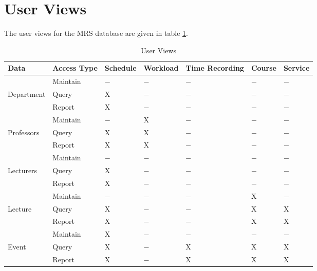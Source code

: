 \clearpage

\section{User Views}
The user views for the MRS database are given in table \ref{tab:userviews}.

\begin{table}[h]
	\centering
	\begin{tabularx}{\textwidth}{XXXXXXX}
		Data & Access Type & Schedule & Workload & Time Recording & Course & Service \\
		\toprule
				& Maintain	& $-$ 	& $-$	& $-$	& $-$ 	& $-$	\\
		Department	& Query		& X 	& $-$	& $-$	& $-$ 	& $-$	\\
				& Report	& X 	& $-$	& $-$	& $-$ 	& $-$	\\
		\midrule
				& Maintain	& $-$ 	& X 	& $-$	& $-$	& $-$	\\
		Professors	& Query		& X 	& X 	& $-$	& $-$	& $-$	\\
				& Report	& X 	& X 	& $-$	& $-$	& $-$	\\
		\midrule
				& Maintain	& $-$ 	& $-$ 	& $-$	& $-$	& $-$	\\
		Lecturers	& Query		& X 	& $-$	& $-$	& $-$	& $-$	\\
				& Report	& X 	& $-$	& $-$	& $-$	& $-$	\\
		\midrule
				& Maintain	& $-$ 	& $-$	& $-$	& X	& $-$	\\
		Lecture		& Query		& X 	& $-$	& $-$	& X	& X	\\
				& Report	& X 	& $-$	& $-$	& X	& X	\\
		\midrule
				& Maintain	& X 	& $-$	& $-$	& $-$	& $-$	\\
		Event		& Query		& X 	& $-$	& X	& X	& X	\\
				& Report	& X 	& $-$	& X	& X	& X	\\
	\end{tabularx}
	\caption{User Views}
	\label{tab:userviews}
\end{table}
